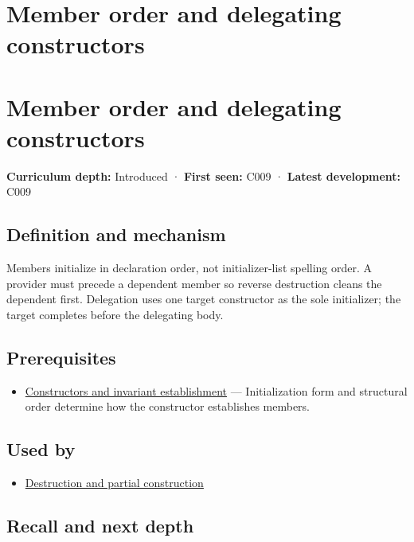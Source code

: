 \hypertarget{appendix-3cb49709605a}{}
\section*{Member order and delegating constructors}
\section{Member order and delegating constructors}\label{appendix-3cb49709605a-member-order-and-delegating-constructors}

\textbf{Curriculum depth:} Introduced · \textbf{First seen:} C009 · \textbf{Latest development:} C009

\subsection{Definition and mechanism}\label{appendix-3cb49709605a-definition-and-mechanism}

Members initialize in declaration order, not initializer-list spelling order. A provider must precede a dependent member so reverse destruction cleans the dependent first. Delegation uses one target constructor as the sole initializer; the target completes before the delegating body.

\subsection{Prerequisites}\label{appendix-3cb49709605a-prerequisites}

\begin{itemize}
\tightlist
\item
  \hyperref[appendix-7f8ec83d0886]{Constructors and invariant establishment} --- Initialization form and structural order determine how the constructor establishes members.
\end{itemize}

\subsection{Used by}\label{appendix-3cb49709605a-used-by}

\begin{itemize}
\tightlist
\item
  \hyperref[appendix-9bfe377cef7a]{Destruction and partial construction}
\end{itemize}

\subsection{Recall and next depth}\label{appendix-3cb49709605a-recall-and-next-depth}

